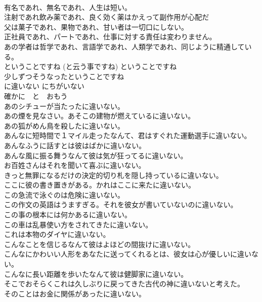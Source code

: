 \documentclass[8pt]{extreport}
\begin{document}
\begin{CJK}{UTF8}{min}
\\	有名であれ、無名であれ、人生は短い。   
\\	注射であれ飲み薬であれ、良く効く薬はかえって副作用が心配だ  
\\	父は菓子であれ、果物であれ、甘い者は一切口にしない。  
\\	正社員であれ、パートであれ、仕事に対する責任は変わりません。  
\\	あの学者は哲学であれ、言語学であれ、人類学であれ、同じように精通している。  
\\	ということですね (と云う事ですね)	ということですね	
\\	少しずつそうなったということですね   
\\	に違いない	にちがいない	
\\	確かに　と　おもう	
\\	あのシチューが当たったに違いない。   
\\	あの煙を見なさい。あそこの建物が燃えているに違いない。   
\\	あの狐がめん鳥を殺したに違いない。   
\\	あんなに短時間で１マイル走ったなんて、君はすぐれた運動選手に違いない。   
\\	あんなふうに話すとは彼はばかに違いない。   
\\	あんな風に振る舞うなんて彼は気が狂ってるに違いない。   
\\	お百姓さんはそれを聞いて喜ぶに違いない。   
\\	きっと無罪になるだけの決定的切り札を隠し持っているに違いない。   
\\	ここに彼の書き置きがある。かれはここに来たに違いない。  
\\	この急流で泳ぐのは危険に違いない。   
\\	この作文の英語はうますぎる。それを彼女が書いていないのに違いない。  
\\	この事の根本には何かあるに違いない。   
\\	この車は乱暴使い方をされてきたに違いない。  
\\	これは本物のダイヤに違いない。   
\\	こんなことを信じるなんて彼はよほどの間抜けに違いない。   
\\	こんなにかわいい人形をあなたに送ってくれるとは、彼女は心が優しいに違いない。   
\\	こんなに長い距離を歩いたなんて彼は健脚家に違いない。   
\\	そこでおそらくこれは久しぶりに戻ってきた古代の神に違いないと考えた。   
\\	そのことはお金に関係があったに違いない。   

\end{CJK}
\end{document}
